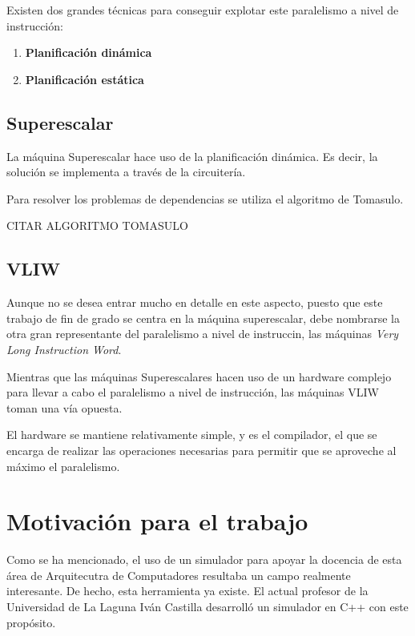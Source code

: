 \bigskip
Existen dos grandes técnicas para conseguir explotar este paralelismo a nivel de instrucción:

\begin{enumerate}

\item \textbf{Planificación dinámica}

\item \textbf{Planificación estática}

\end{enumerate}

\subsection{Superescalar}

La máquina Superescalar hace uso de la planificación dinámica. Es decir, la solución se implementa a través
de la circuitería.

\bigskip
Para resolver los problemas de dependencias se utiliza el algoritmo de Tomasulo.

CITAR ALGORITMO TOMASULO 

\subsection{VLIW}

Aunque no se desea entrar mucho en detalle en este aspecto, puesto que este trabajo de 
fin de grado se centra en la máquina superescalar, debe nombrarse la otra gran 
representante del paralelismo a nivel de instruccin, las máquinas \textit{Very Long Instruction Word}.

\bigskip
Mientras que las máquinas Superescalares hacen uso de un hardware complejo para llevar
a cabo el paralelismo a nivel de instrucción, las máquinas VLIW toman una vía opuesta.

\bigskip
El hardware se mantiene relativamente simple, y es el compilador, el que se encarga
de realizar las operaciones necesarias para permitir que se aproveche al máximo el 
paralelismo.

\section{Motivación para el trabajo}
\label{1:sec:3}

Como se ha mencionado, el uso de un simulador para apoyar la docencia de esta área
de Arquitecutra de Computadores resultaba un campo realmente interesante. De hecho,
esta herramienta ya existe. El actual profesor de la Universidad de La Laguna 
Iván Castilla desarrolló un simulador en C++ con este propósito.

